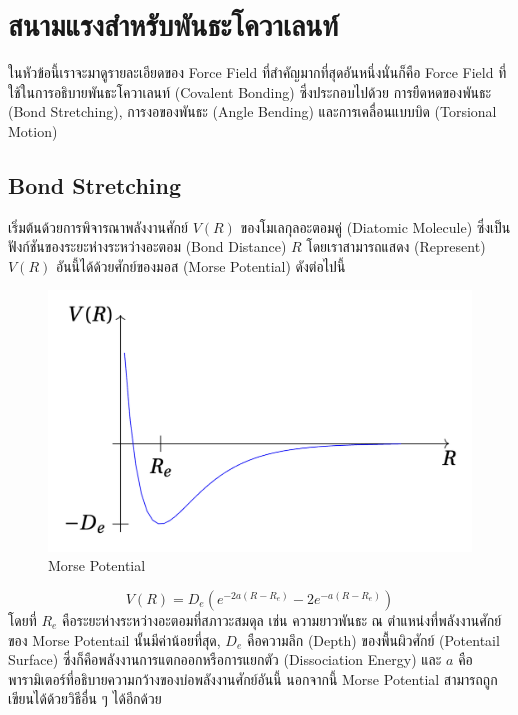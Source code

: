 \section{สนามแรงสำหรับพันธะโควาเลนท์}
\label{sec:md_ff_covalent_bond}

ในหัวข้อนี้เราจะมาดูรายละเอียดของ Force Field ที่สำคัญมากที่สุดอันหนึ่งนั่นก็คือ Force Field ที่ใช้ในการอธิบายพันธะโควาเลนท์ (Covalent Bonding) ซึ่งประกอบไปด้วย การยืดหดของพันธะ (Bond Stretching), การงอของพันธะ (Angle Bending) และการเคลื่อนแบบบิด (Torsional Motion)

\subsection{Bond Stretching}

เริ่มต้นด้วยการพิจารณาพลังงานศักย์ $V(R)$ ของโมเลกุลอะตอมคู่ (Diatomic Molecule) ซึ่งเป็นฟังก์ชันของระยะห่างระหว่างอะตอม (Bond Distance) $R$ โดยเราสามารถแสดง (Represent) $V(R)$ อันนี้ได้ด้วยศักย์ของมอส (Morse Potential) ดังต่อไปนี้

\begin{figure}[H]
  \centering
  \includegraphics[width=0.6\linewidth]{fig/morse-potential.png}
  \caption{Morse Potential}
  \label{fig:morse_potential}
\end{figure}

\begin{equation}
  \label{eq:potential_bond_stretch}
  V(R) = D_{e} \left( e^{-2a(R-R_{e})} -2e^{-a(R-R_{e})} \right)
\end{equation}
%
โดยที่ $R_{e}$ คือระยะห่างระหว่างอะตอมที่สภาวะสมดุล เช่น ความยาวพันธะ ณ ตำแหน่งที่พลังงานศักย์ของ Morse Potentail นั้นมีค่าน้อยที่สุด, $D_{e}$ คือความลึก (Depth) ของพื้นผิวศักย์ (Potentail Surface) ซึ่งก็คือพลังงานการแตกออกหรือการแยกตัว (Dissociation Energy) และ $a$ คือพารามิเตอร์ที่อธิบายความกว้างของบ่อพลังงานศักย์อันนี้ นอกจากนี้ Morse Potential สามารถถูกเขียนได้ด้วยวิธีอื่น ๆ ได้อีกด้วย

